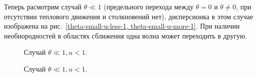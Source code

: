 \documentclass[10pt, a4paper]{article}
\numberwithin{equation}{section}
\begin{document}
Теперь расмотрим случай $\theta \ll 1$ (предельного перехода между $\theta=0$ и $\theta \neq 0$, при отсутствии
теплового движения и столкновений нет), дисперсионка в этом случае изображена на рис.~\ref{theta-small-u-less-1, theta-small-u-more-1}. При наличии необнородностей в областях сближения одна волна может переходить в другую.
\begin{figure}[h!]
    \caption{\label{theta-small-u-less-1} Случай $\theta\ll1, u < 1$.}
\end{figure}

\begin{figure}[h!]
    \caption{\label{theta-small-u-more-1} Случай $\theta\ll1, u < 1$.}
\end{figure}
\end{document}
